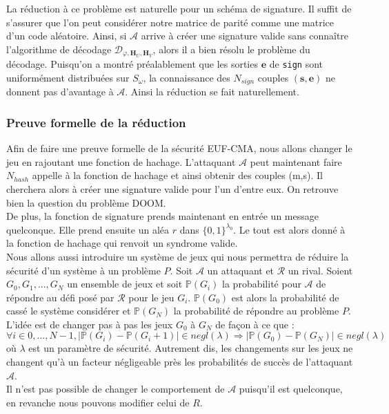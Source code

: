 \documentclass[12pt]{article}
\theoremstyle{plain}
\newcommand{\e}{\mathbf{e}}
\newcommand{\s}{\mathbf{s}}
\begin{document}
\noindent La réduction à ce problème est naturelle pour un schéma de signature. Il suffit de s'assurer que l'on peut considérer notre matrice de parité comme une matrice d'un code aléatoire. Ainsi, si $\mathcal{A}$ arrive à créer une signature valide sans connaître l'algorithme de décodage $\mathcal{D}_{\varphi,\mathbf{H}_{U},\mathbf{H}_{V}}$, alors il a bien résolu le problème du décodage. Puisqu'on a montré préalablement que les sorties $\e$ de \verb|sign| sont uniformément distribuées sur $S_{\omega}$, la connaissance des $N_{sign}$ couples $(\s,\e)$ ne donnent pas d'avantage à $\mathcal{A}$. Ainsi la réduction se fait naturellement. \\


\subsubsection{Preuve formelle de la réduction}
Afin de faire une preuve formelle de la sécurité EUF-CMA, nous allons changer le jeu en rajoutant une fonction de hachage. L'attaquant $\mathcal{A}$ peut maintenant faire $N_{hash}$ appelle à la fonction de hachage et ainsi obtenir des couples (m,s). Il cherchera alors à créer une signature valide pour l'un d'entre eux. On retrouve bien la question du problème DOOM. \\
De plus, la fonction de signature prends maintenant en entrée un message quelconque. Elle prend ensuite un aléa $r$ dans $\{0,1\}^{\lambda_0}$. Le tout est alors donné à la fonction de hachage qui renvoit un syndrome valide. \\

\noindent Nous allons aussi introduire un système de jeux qui nous permettra de réduire la sécurité d'un système à un problème $P$. Soit $\mathcal{A}$ un attaquant et $\mathcal{R}$ un rival. Soient $G_0, G_1, ...,G_N$ un ensemble de jeux et soit $\mathbb{P}(G_i)$ la probabilité pour $\mathcal{A}$ de répondre au défi posé par $\mathcal{R}$ pour le jeu $G_i$. $\mathbb{P}(G_0)$ est alors la probabilité de cassé le système considérer et $\mathbb{P}(G_N)$ la probabilité de répondre au problème $P$. \\
L'idée est de changer pas à pas les jeux $G_0$ à $G_N$ de façon à ce que :
$$\forall i \in {0,...,N-1}, |\mathbb{P}(G_i)-\mathbb{P}(G_i+1)| \in negl(\lambda) \Longrightarrow |\mathbb{P}(G_0)-\mathbb{P}(G_N)|  \in negl(\lambda)$$
où $\lambda$ est un paramètre de sécurité. Autrement dis, les changements sur les jeux ne changent qu'à un facteur négligeable près les probabilités de succès de l'attaquant $\mathcal{A}$. \\
Il n'est pas possible de changer le comportement de $\mathcal{A}$ puisqu'il est quelconque, en revanche nous pouvons modifier celui de $R$. \\
\end{document}
